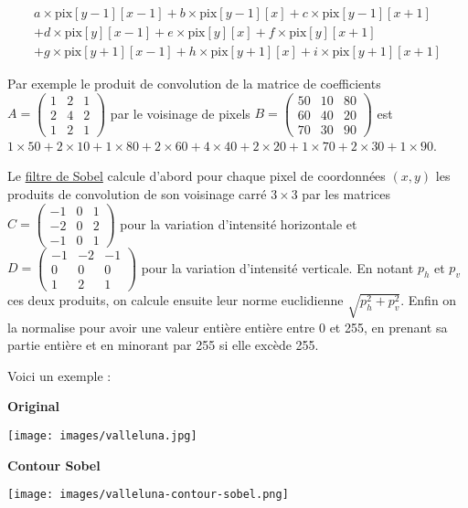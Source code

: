 \documentclass[a4paper, french, 12pt]{article}  %
\begin{document}
\begin{multline*}
a \times \text{pix}[y-1][x-1] + b \times \text{pix}[y-1][x] + c \times \text{pix}[y-1][x+1] \\
+ d \times \text{pix}[y][x-1] + e \times \text{pix}[y][x] + f \times \text{pix}[y][x+1]  \\
+ g \times \text{pix}[y+1][x-1] + h \times \text{pix}[y+1][x] + i \times \text{pix}[y+1][x+1] 
\end{multline*}


Par exemple le produit de convolution de la matrice de coefficients $A=\begin{pmatrix} 1 & 2 & 1 \\ 2 & 4 & 2 \\ 1 & 2 & 1 \end{pmatrix}$ par le voisinage de pixels $B=\begin{pmatrix} 50 & 10 & 80 \\ 60 & 40 & 20 \\ 70 & 30 & 90 \end{pmatrix}$ est $1 \times 50 + 2 \times 10 + 1 \times 80 + 2 \times 60 + 4 \times 40 + 2 \times 20 + 1 \times 70 + 2 \times 30 + 1 \times 90$.


Le \href{https://fr.wikipedia.org/wiki/Filtre_de_Sobel}{filtre de Sobel} calcule d'abord pour chaque pixel de coordonnées $(x,y)$ les produits de convolution de son voisinage carré $3 \times 3$ par les matrices $C=\begin{pmatrix} -1 & 0 & 1 \\ -2 & 0 & 2 \\ -1 & 0 & 1 \end{pmatrix}$ pour la variation d'intensité horizontale et  $D=\begin{pmatrix}  -1 & -2 & -1 \\ 0 & 0 & 0 \\ 1 & 2 & 1 \end{pmatrix}$ pour la variation d'intensité verticale. En notant $p_{h}$ et $p_{v}$ ces deux produits,  on calcule ensuite leur norme euclidienne $\sqrt{p_{h}^{2}+p_{v}^{2}}$. Enfin  on la normalise pour avoir une valeur entière entière entre 0 et 255, en prenant sa partie  entière et  en minorant par 255 si elle excède 255.

Voici un exemple :

\begin{minipage}{0.45\linewidth}
\begin{center}
\textbf{Original}
 
\texttt{[image: images/valleluna.jpg]}
\end{center}
\end{minipage}\hfill
\begin{minipage}{0.45\linewidth}
\begin{center}
\textbf{Contour Sobel}

\texttt{[image: images/valleluna-contour-sobel.png]}
\end{center}
\end{minipage}
\end{document}
